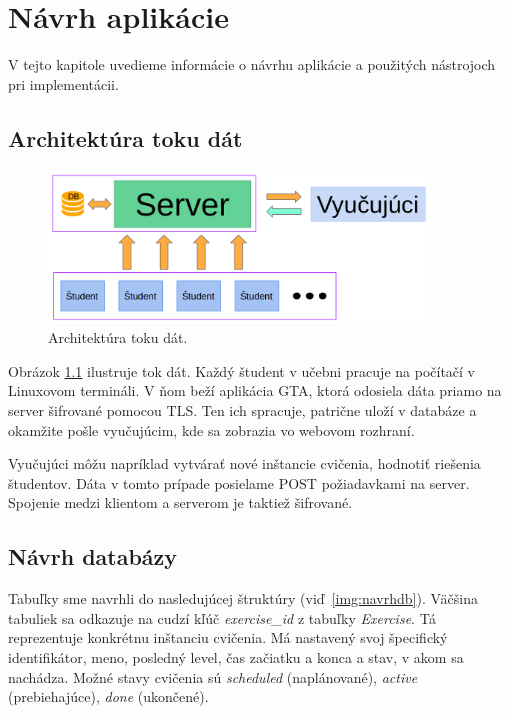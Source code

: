 \chapter{Návrh aplikácie}
\label{kap:navrh}

V tejto kapitole uvedieme informácie o návrhu aplikácie a použitých nástrojoch
pri implementácii.

\section{Architektúra toku dát}
\label{sec:architekturadata}

\begin{figure}[h]
	\centerline{\includegraphics[width=0.9\textwidth]{images/architekturadat.png}}
	\caption[Architektúra toku dát]{Architektúra toku dát.}
	\label{img:architekturadata}
\end{figure}

Obrázok \ref{img:architekturadata} ilustruje tok dát. Každý študent v učebni pracuje
na počítačí v Linuxovom termináli. V ňom beží aplikácia GTA, ktorá odosiela dáta
priamo na server šifrované pomocou TLS. Ten ich spracuje, patrične uloží v databáze
a okamžite pošle vyučujúcim, kde sa zobrazia vo webovom rozhraní.

Vyučujúci môžu napríklad vytvárať nové inštancie cvičenia, hodnotiť riešenia študentov.
Dáta v tomto prípade posielame POST požiadavkami na server. Spojenie medzi klientom
a serverom je taktiež šifrované.

\section{Návrh databázy}
\label{sec:navrhdb}

Tabuľky sme navrhli do nasledujúcej štruktúry (viď~\ref{img:navrhdb}).
Väčšina tabuliek sa odkazuje na cudzí kľúč \textit{exercise\_id} z tabuľky
\textit{Exercise}. Tá reprezentuje konkrétnu inštanciu cvičenia. Má nastavený svoj
špecifický identifikátor, meno, posledný level, čas začiatku a konca a stav, v
akom sa nachádza. Možné stavy cvičenia sú \textit{scheduled} (naplánované),
\textit{active} (prebiehajúce), \textit{done} (ukončené).

